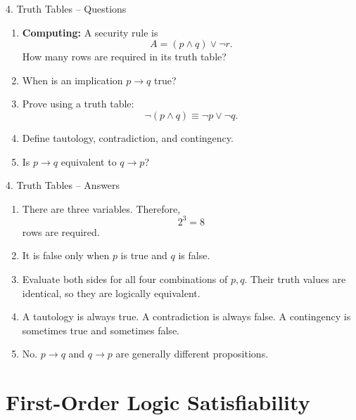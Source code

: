 \documentclass[aspectratio=169,11pt]{beamer}
\begin{document}
\begin{frame}{4. Truth Tables -- Questions}

\begin{enumerate}
\item \textbf{Computing:} A security rule is
\[
A=(p\land q)\lor\neg r.
\]
How many rows are required in its truth table?

\item When is an implication $p\to q$ true?

\item Prove using a truth table:
\[
\neg(p\land q)\equiv\neg p\lor\neg q.
\]

\item Define tautology, contradiction, and contingency.

\item Is $p\to q$ equivalent to $q\to p$?
\end{enumerate}

\end{frame}

\begin{frame}{4. Truth Tables -- Answers}

\begin{enumerate}
\item There are three variables. Therefore,
\[
2^3=8
\]
rows are required.

\item It is false only when $p$ is true and $q$ is false.

\item Evaluate both sides for all four combinations of $p,q$. Their truth values are identical, so they are logically equivalent.

\item A tautology is always true. A contradiction is always false. A contingency is sometimes true and sometimes false.

\item No. $p\to q$ and $q\to p$ are generally different propositions.
\end{enumerate}

\end{frame}


\section{First-Order Logic Satisfiability}
\end{document}
